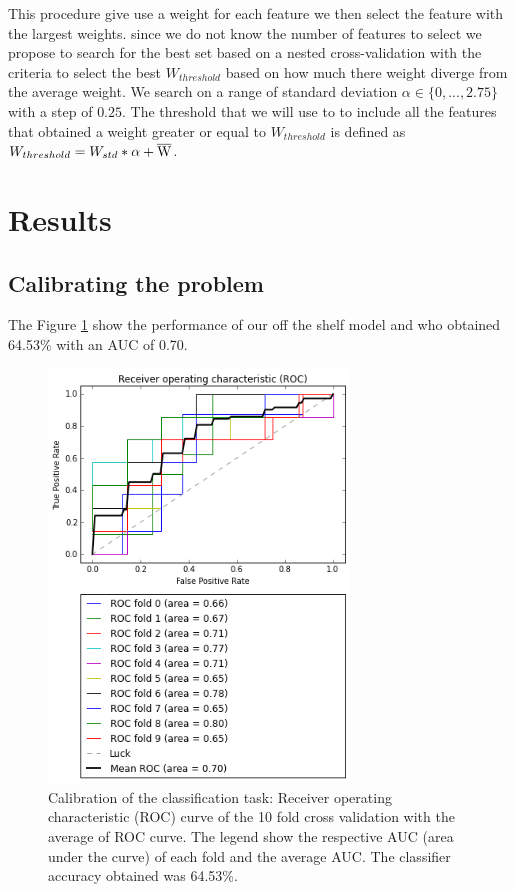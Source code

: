 \documentclass[12pt,journal,compsoc]{IEEEtran}
\begin{document}
This procedure give use a weight for each feature we then select the feature with the largest weights. since we do not know the number of features to select we propose to search for the best set based on a nested cross-validation with the criteria to select the best $W_{threshold}$ based on how much there weight diverge from the average weight. We search on a range of standard deviation $\alpha\in\{0,...,2.75\}$ with a step of $0.25$. The threshold that we will use to to include all the features that obtained a weight greater or equal to $W_{threshold}$ is defined as $W_{threshold} = W_{std}*\alpha+\overline{\rm W}$.


\section{Results}

\subsection{Calibrating the problem}

 The Figure \ref{fig_calib_svm} show the performance of our off the shelf model and who obtained 64.53\% with an AUC of 0.70.
 
\begin{figure}[h]
\centering
\includegraphics[width=8cm]{svc_linear_calibration_scale64x64.png}
\caption{Calibration of the classification task: Receiver operating characteristic (ROC) curve of the 10 fold cross validation with the average of ROC curve. The legend show the respective AUC (area under the curve) of each fold and the average AUC. The classifier accuracy obtained was 64.53\%.}
\label{fig_calib_svm}
\end{figure}
\end{document}
